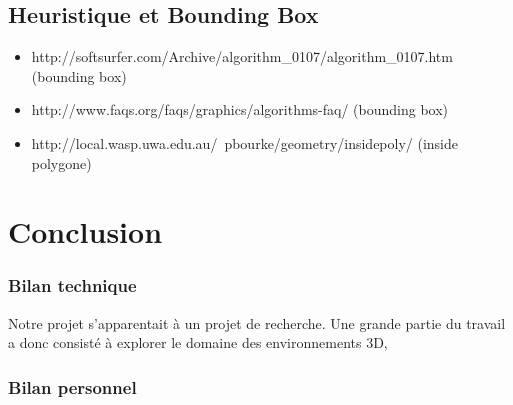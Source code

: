 \documentclass[a4paper,12pt]{report}
\begin{document}
 

\section*{Heuristique et Bounding Box}
\begin{itemize}
 \item http://softsurfer.com/Archive/algorithm\_0107/algorithm\_0107.htm (bounding box)
 
 \item http://www.faqs.org/faqs/graphics/algorithms-faq/  (bounding box)
 
 \item http://local.wasp.uwa.edu.au/~pbourke/geometry/insidepoly/ (inside polygone)
\end{itemize} 

\chapter{Conclusion}

\subsection*{Bilan technique}

Notre projet s'apparentait à un projet de recherche. Une grande partie du travail a donc consisté à explorer le domaine des environnements 3D, 

\subsection*{Bilan personnel}
\end{document}
